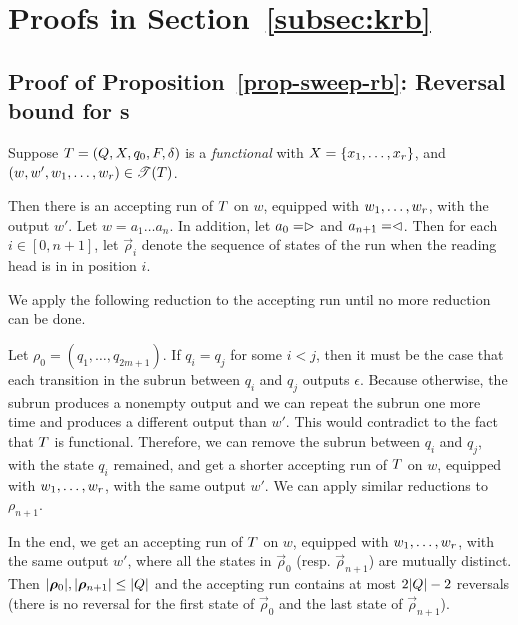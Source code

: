 \newcommand\init{\mathsf{init}}
\newcommand\mkright{\mathsf{markright}}
\newcommand\mkleft{\mathsf{markleft}}
\newcommand\finalpass{\mathsf{finalpass}}
\newcommand\reverse{\mathsf{reverse}}
\newcommand\concatpt{\mathsf{concat}}
\newcommand\symof[1]{\overline{#1}}

\section{Proofs in Section~\ref{subsec:krb} }\label{app-rb-2pt}

\subsection{Proof of Proposition~\ref{prop-sweep-rb}: Reversal bound for \SPPT{}s}

Suppose $T=(Q, X, q_0, F, \delta)$ is a \emph{functional} \SPPT{}  with $X= \{x_1,\ldots, x_r\}$, and $(w, w', w_1,\ldots, w_r) \in \mathscr{T}(T)$. 

Then there is an accepting run of $T$ on $w$, equipped with $w_1,\ldots, w_r$, with the output $w'$. 
Let $w = a_1 \ldots a_n$. In addition, let $a_0 = \vartriangleright$ and $a_{n+1} = \vartriangleleft$. 
Then for each $i \in [0, n+1]$, let $\vec{\rho}_i$ denote the sequence of states of the run when the reading head is in in position $i$.

We apply the following reduction to the accepting run until no more reduction can be done. 

Let $\rho_0 = (q_1, \ldots, q_{2m+1})$. If $q_i = q_j$ for some $i < j$, then it must be the case that each transition in the subrun between $q_i$ and $q_j$ outputs $\epsilon$. Because otherwise, the subrun produces a nonempty output and we can repeat the subrun one more time and produces a different output than $w'$. This would contradict to the fact that $T$ is functional. Therefore, we can remove the subrun between $q_i$ and $q_j$, with the state $q_i$ remained, and get a shorter accepting run of $T$ on $w$, equipped with $w_1,\ldots, w_r$, with the same output $w'$.
We can apply similar reductions to $\rho_{n+1}$.

In the end, we get an accepting run of $T$ on $w$, equipped with $w_1,\ldots, w_r$, with the same output $w'$, where all the states in $\vec{\rho}_0$ (resp. $\vec{\rho}_{n+1}$) are mutually distinct. Then $|\vec{\rho}_0|, |\vec{\rho}_{n+1}| \le |\controls|$ and the accepting run contains at most $2|Q|-2$ reversals (there is no reversal for the first state of $\vec{\rho}_0$ and the last state of $\vec{\rho}_{n+1}$). 


